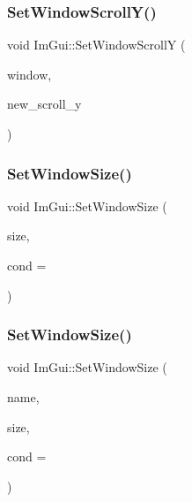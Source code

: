 \subsubsection{\texorpdfstring{Set\+Window\+Scroll\+Y()}{SetWindowScrollY()}}
{\footnotesize\ttfamily void Im\+Gui\+::\+Set\+Window\+ScrollY (\begin{DoxyParamCaption}\item[{\mbox{\hyperlink{struct_im_gui_window}{Im\+Gui\+Window}} $\ast$}]{window,  }\item[{float}]{new\+\_\+scroll\+\_\+y }\end{DoxyParamCaption})}

\mbox{\label{namespace_im_gui_a657c6cc2246485332f608a5204447ea1}} 
\subsubsection{\texorpdfstring{Set\+Window\+Size()}{SetWindowSize()}\hspace{0.1cm}{\footnotesize\ttfamily [1/2]}}
{\footnotesize\ttfamily void Im\+Gui\+::\+Set\+Window\+Size (\begin{DoxyParamCaption}\item[{const \mbox{\hyperlink{struct_im_vec2}{Im\+Vec2}} \&}]{size,  }\item[{\mbox{\hyperlink{imgui_8h_aef890d6ac872e12c5804d0b3e4f7f103}{Im\+Gui\+Cond}}}]{cond = {} }\end{DoxyParamCaption})}

\mbox{\label{namespace_im_gui_a441528b9198d4531e79337121212cd33}} 
\subsubsection{\texorpdfstring{Set\+Window\+Size()}{SetWindowSize()}\hspace{0.1cm}{\footnotesize\ttfamily [2/2]}}
{\footnotesize\ttfamily void Im\+Gui\+::\+Set\+Window\+Size (\begin{DoxyParamCaption}\item[{const char $\ast$}]{name,  }\item[{const \mbox{\hyperlink{struct_im_vec2}{Im\+Vec2}} \&}]{size,  }\item[{\mbox{\hyperlink{imgui_8h_aef890d6ac872e12c5804d0b3e4f7f103}{Im\+Gui\+Cond}}}]{cond = {} }\end{DoxyParamCaption})}

